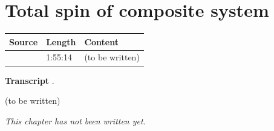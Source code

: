 \chapter{Total spin of composite system}\label{ch:c35}
\begin{paracol}{2}

\begin{sources}
\begin{tabularx}{\linewidth}{@{}l l L@{}}
\toprule
\textbf{Source} & \textbf{Length} & \textbf{Content}\\
\midrule
{} & 1:55:14 & (to be written)\\
\bottomrule
\end{tabularx}

\smallskip
\textbf{Transcript} .
\end{sources}

\begin{reading}
(to be written)
\end{reading}

\emph{This chapter has not been written yet.}

\flushside
\end{paracol}
